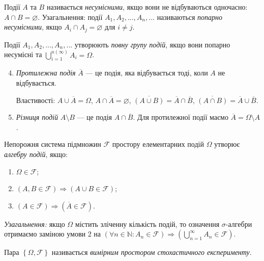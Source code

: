 \begin{definition}
    Події $A$ та $B$ називається \emph{несумісними}, якщо вони не відбуваються одночасно: $A \cap B = \varnothing$.
    Узагальнення: події $A_1, A_2, ..., A_n, ...$ називаються \emph{попарно несумісними}, якщо $A_i \cap A_j = \varnothing$ для $i \neq j$.
\end{definition}
\begin{definition}
    Події $A_1, A_2, ..., A_n, ...$ утворюють \emph{повну групу подій}, якщо вони попарно несумісні 
    та $\bigcup\limits_{i=1}^{n \left( \infty \right)} A_i = \Omega$.
\end{definition}
\begin{enumerate}
    \setcounter{enumi}{3}
    \item \emph{Протилежна подія} $\overline{A}$ --- це подія, яка відбувається тоді, коли $A$ не відбувається.
    
    Властивості: $A \cup \overline{A} = \Omega$, $A \cap \overline{A} = \varnothing$, $\overline{\left( A \cup B \right)} = \overline{A} \cap \overline{B}$,
    $\overline{\left( A \cap B \right)} = \overline{A} \cup \overline{B}$.
    \item \emph{Різниця подій} $A \setminus B$ --- це подія $A \cap \overline{B}$. Для протилежної події маємо $\overline{A} =  \Omega \setminus A$.
\end{enumerate}

\begin{definition}
    Непорожня система підмножин $\mathcal{F}$ простору елементарних подій $\Omega$ утворює \emph{алгебру подій}, якщо:
    \begin{enumerate}
        \item $\Omega \in \mathcal{F}$;
        \item $\left( A, B \in \mathcal{F}\right) \Rightarrow \left( A \cup B \in \mathcal{F}\right)$;
        \item $\left( A \in \mathcal{F}\right) \Rightarrow \left( \overline{A} \in \mathcal{F}\right)$.
    \end{enumerate}
    \emph{Узагальнення:} якщо $\Omega$ містить зліченну кількість подій, то означення $\sigma$-алгебри отримаємо заміною умови
    2 на $\left(\forall n \in \mathbb{N}: A_n \in \mathcal{F} \right) \Rightarrow \left( \bigcup\limits_{n=1}^{\infty} A_n \in \mathcal{F}\right)$.
    
    Пара $\left\{\Omega, \mathcal{F}\right\}$ називається \emph{вимірним простором стохастичного експерименту}.
\end{definition}

